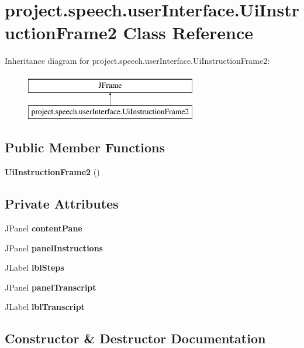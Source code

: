 \section{project.\+speech.\+user\+Interface.\+Ui\+Instruction\+Frame2 Class Reference}
\label{classproject_1_1speech_1_1user_interface_1_1_ui_instruction_frame2}
Inheritance diagram for project.\+speech.\+user\+Interface.\+Ui\+Instruction\+Frame2\+:\begin{figure}[H]
\begin{center}
\leavevmode
\includegraphics[height=2.000000cm]{classproject_1_1speech_1_1user_interface_1_1_ui_instruction_frame2}
\end{center}
\end{figure}
\subsection*{Public Member Functions}
\begin{DoxyCompactItemize}
\item 
{\bf Ui\+Instruction\+Frame2} ()
\end{DoxyCompactItemize}
\subsection*{Private Attributes}
\begin{DoxyCompactItemize}
\item 
J\+Panel {\bf content\+Pane}
\item 
J\+Panel {\bf panel\+Instructions}
\item 
J\+Label {\bf lbl\+Steps}
\item 
J\+Panel {\bf panel\+Transcript}
\item 
J\+Label {\bf lbl\+Transcript}
\end{DoxyCompactItemize}


\subsection{Constructor \& Destructor Documentation}
